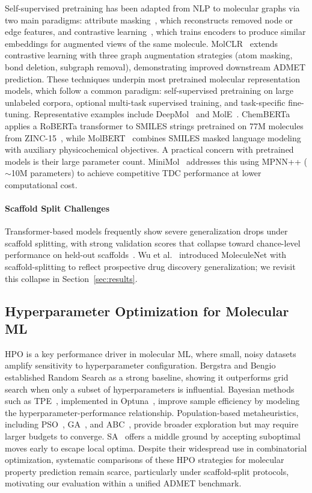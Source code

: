 \documentclass[journal]{IEEEtran}
\begin{document}
Self-supervised pretraining has been adapted from NLP to molecular graphs via two main paradigms: attribute masking~\cite{attrMasking}, which reconstructs removed node or edge features, and contrastive learning~\cite{contrativeLearning}, which trains encoders to produce similar embeddings for augmented views of the same molecule. MolCLR~\cite{molclr} extends contrastive learning with three graph augmentation strategies (atom masking, bond deletion, subgraph removal), demonstrating improved downstream ADMET prediction. These techniques underpin most pretrained molecular representation models, which follow a common paradigm: self-supervised pretraining on large unlabeled corpora, optional multi-task supervised training, and task-specific fine-tuning. Representative examples include DeepMol~\cite{deepMol} and MolE~\cite{molE}. ChemBERTa~\cite{chemberta2} applies a RoBERTa transformer to SMILES strings pretrained on 77M molecules from ZINC-15~\cite{sterling2015zinc15}, while MolBERT~\cite{molbert} combines SMILES masked language modeling with auxiliary physicochemical objectives. A practical concern with pretrained models is their large parameter count. MiniMol~\cite{miniMol} addresses this using MPNN++ ($\sim$10M parameters) to achieve competitive TDC performance at lower computational cost.

\paragraph{Scaffold Split Challenges}
Transformer-based models frequently show severe generalization drops under scaffold splitting, with strong validation scores that collapse toward chance-level performance on held-out scaffolds~\cite{yang2019dmpnn,chemberta2}. Wu et al.~\cite{wu2018moleculenet} introduced MoleculeNet with scaffold-splitting to reflect prospective drug discovery generalization; we revisit this collapse in Section~\ref{sec:results}.

\subsection{Hyperparameter Optimization for Molecular ML}

HPO is a key performance driver in molecular ML, where small, noisy datasets amplify sensitivity to hyperparameter configuration. Bergstra and Bengio~\cite{bergstra2012random} established Random Search as a strong baseline, showing it outperforms grid search when only a subset of hyperparameters is influential. Bayesian methods such as TPE~\cite{bergstra2011tpe}, implemented in Optuna~\cite{akiba2019optuna}, improve sample efficiency by modeling the hyperparameter-performance relationship. Population-based metaheuristics, including PSO~\cite{kennedy1995pso}, GA~\cite{holland1975ga}, and ABC~\cite{karaboga2005abc}, provide broader exploration but may require larger budgets to converge. SA~\cite{saopt} offers a middle ground by accepting suboptimal moves early to escape local optima. Despite their widespread use in combinatorial optimization, systematic comparisons of these HPO strategies for molecular property prediction remain scarce, particularly under scaffold-split protocols, motivating our evaluation within a unified ADMET benchmark.
\end{document}
